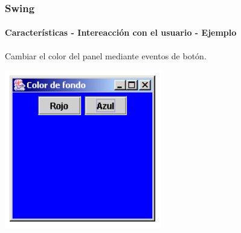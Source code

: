 \documentclass{beamer}
\begin{document}
	\begin{frame}
		\frametitle{Swing}
		\framesubtitle{Caracter\'isticas - Intereacci\'on con el usuario - Ejemplo}

        Cambiar el color del panel mediante eventos de bot\'on.
        \begin{center}
	        	\includegraphics[scale=.45]{images/colores.png}
	    \end{center}
	\end{frame}	

{ %
    \begin{frame}[plain]
    \end{frame}
}
\end{document}
